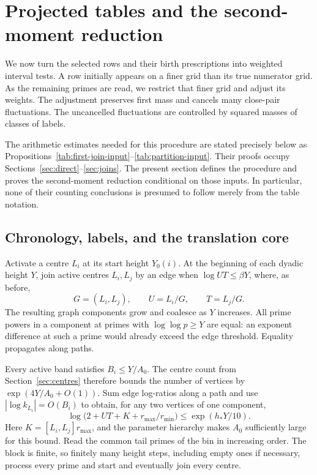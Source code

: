 \section{Projected tables and the second-moment reduction}
\label{sec:tables}

We now turn the selected rows and their birth prescriptions into weighted
interval tests.  A row initially appears on a finer grid than its true
numerator grid.  As the remaining primes are read, we restrict that finer
grid and adjust its weights.  The adjustment preserves first mass and
cancels many close-pair fluctuations.  The uncancelled fluctuations are
controlled by squared masses of classes of labels.

The arithmetic estimates needed for this procedure are stated precisely
below as Propositions~\ref{tab:first-join-input}--\ref{tab:partition-input}.
Their proofs occupy Sections~\ref{sec:direct}--\ref{sec:joins}.  The present
section defines the procedure and proves the second-moment reduction
conditional on those inputs.  In particular, none of their counting
conclusions is presumed to follow merely from the table notation.

\subsection{Chronology, labels, and the translation core}

Activate a centre $L_i$ at its start height $Y_0(i)$.  At the beginning of
each dyadic height $Y$, join active centres $L_i,L_j$ by an edge when
$\log UT\le\beta Y$, where, as before,
\[
 G=(L_i,L_j),\qquad U=L_i/G,\qquad T=L_j/G.
\]
The resulting graph components grow and coalesce as $Y$ increases.  All
prime powers in a component at primes with $\log\log p\ge Y$ are equal:
an exponent difference at such a prime would already exceed the edge
threshold.  Equality propagates along paths.

Every active band satisfies $B_i\le Y/A_0$.  The centre count from
Section~\ref{sec:centres} therefore bounds the number of vertices by
$\exp(4Y/A_0+O(1))$.  Sum edge log-ratios along a path and use
$|\log k_{L_i}|=O(B_i)$ to obtain, for any two vertices of one component,
\begin{equation}
 \log\bigl(2+UT+K+r_{\max}/r_{\min}\bigr)
 \le \exp(h_*Y/10).
 \label{eq:component-path}
\end{equation}
Here $K=[L_i,L_j]r_{\max}$, and the parameter hierarchy makes $A_0$
sufficiently large for this bound.  Read the common tail primes of the
bin in increasing order.  The block is finite, so finitely many height
steps, including empty ones if necessary, process every prime and start
and eventually join every centre.

